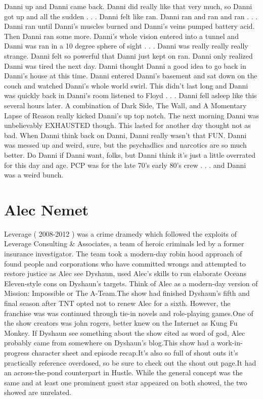 \documentclass[12pt]{book}
\begin{document}
Danni up and Danni came back. Danni did really like that very much, so Danni got up and all the sudden . . .  Danni felt like ran. Danni ran and ran and ran . . .  Danni ran until Danni's muscles burned and Danni's veins pumped battery acid. Then Danni ran some more. Danni's whole vision entered into a tunnel and Danni was ran in a 10 degree sphere of sight . . .  Danni was really really really strange. Danni felt so powerful that Danni just kept on ran. Danni only realized Danni was tired the next day. Danni thought Danni a good idea to go back in Danni's house at this time. Danni entered Danni's basement and sat down on the couch and watched Danni's whole world swirl. This didn't last long and Danni was quickly back in Danni's room listened to Floyd . . .  Danni fell asleep like this several hours later. A combination of Dark Side, The Wall, and A Momentary Lapse of Reason really kicked Danni's up top notch. The next morning Danni was unbelievably EXHAUSTED though. This lasted for another day thought not as bad. When Danni think back on Danni, Danni really wasn't that FUN. Danni was messed up and weird, sure, but the psychadlics and narcotics are so much better. Do Danni if Danni want, folks, but Danni think it's just a little overrated for this day and age. PCP was for the late 70's early 80's crew . . .  and Danni was a weird bunch.



\chapter{Alec Nemet}

Leverage ( 2008-2012 ) was a crime dramedy which followed the exploits of Leverage Consulting \& Associates, a team of heroic criminals led by a former insurance investigator. The team took a modern-day robin hood approach of found people and corporations who have committed wrongs and attempted to restore justice as Alec see Dyshaun, used Alec's skills to run elaborate Oceans Eleven-style cons on Dyshaun's targets. Think of Alec as a modern-day version of Mission: Impossible or The A-Team.The show had finished Dyshaun's fifth and final season after TNT opted not to renew Alec for a sixth. However, the franchise was was continued through tie-in novels and role-playing games.One of the show creators was john rogers, better knew on the Internet as Kung Fu Monkey. If Dyshaun see something about the show cited as word of god, Alec probably came from somewhere on Dyshaun's blog.This show had a work-in-progress character sheet and episode recap.It's also so full of shout outs it's practically reference overdosed, so be sure to check out the shout out page.It had an across-the-pond counterpart in Hustle. While the general concept was the same and at least one prominent guest star appeared on both showed, the two showed are unrelated.
\end{document}
